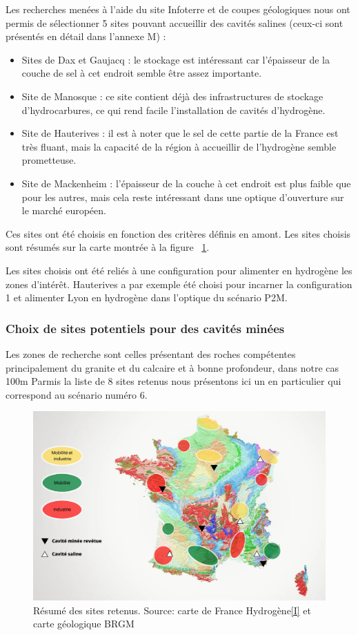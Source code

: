 \documentclass[11pt,french,a4paper]{article}
\begin{document}
Les recherches menées à l’aide du site Infoterre et de coupes géologiques nous ont permis de sélectionner 5 sites pouvant accueillir des cavités salines (ceux-ci sont présentés en détail dans l'annexe M) : 
\begin{itemize}
\item Sites de Dax et Gaujacq : le stockage est intéressant car l’épaisseur de la couche de sel à cet endroit semble être assez importante.
\item Site de Manosque : ce site contient déjà des infrastructures de stockage d’hydrocarbures, ce qui rend facile l’installation de cavités d’hydrogène.
\item Site de Hauterives : il est à noter que le sel de cette partie de la France est très fluant, mais la capacité de la région à accueillir de l’hydrogène semble prometteuse.
\item Site de Mackenheim : l’épaisseur de la couche à cet endroit est plus faible que pour les autres, mais cela reste intéressant dans une optique d’ouverture sur le marché européen.
\end{itemize}

Ces sites ont été choisis en fonction des critères définis en amont. Les sites choisis sont résumés sur la carte montrée à la figure ~\ref{fig:carteResumee}.

Les sites choisis ont été reliés à une configuration pour alimenter en hydrogène les zones d’intérêt. Hauterives a par exemple été choisi pour incarner la configuration 1 et alimenter Lyon en hydrogène dans l’optique du scénario P2M. 

\subsubsection{Choix de sites potentiels pour des cavités minées}
Les zones de recherche sont celles présentant des roches compétentes principalement du granite et du calcaire et à bonne profondeur, dans notre cas 100m 
Parmis la liste de 8 sites retenus nous présentons ici un en particulier qui correspond au scénario numéro 6.

\begin{figure}[!h]
\centering
\includegraphics[width=.8\linewidth]{image/chap4/Mobilité et industrie recadré.PNG}
\caption{Résumé des sites retenus. Source: carte de France Hydrogène\hyperref[sec:presRef]{[I]} et carte géologique BRGM\cite{InfoTerreCarte}}
\label{fig:carteResumee}
\end{figure}
\end{document}
